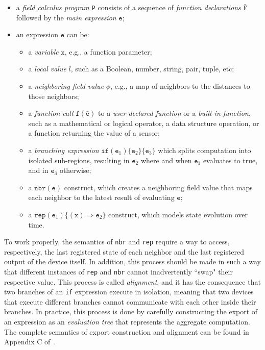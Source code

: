 \begin{itemize}
    \item a \textit{field calculus program} $\texttt{P}$ consists of a sequence of \textit{function declarations} $\bar{\texttt{F}}$ followed by the \textit{main expression} $\texttt{e}$;
    \item an expression $\texttt{e}$ can be:
    \begin{itemize}
        \item a \textit{variable} $\texttt{x}$, e.g., a function parameter;
        \item a \textit{local value} $l$, such as a Boolean, number, string, pair, tuple, etc;
        \item a \textit{neighboring field value} $\phi$, e.g., a map of
        neighbors to the distances to those neighbors;
        \item a \textit{function call} $\texttt{f}(\bar{\texttt{e}})$ to a \textit{user-declared function} or a \textit{built-in function}, such
        as a mathematical or logical operator, a data structure operation, or a function returning the value of a sensor;
        \item a \textit{branching expression} $\texttt{if} (\texttt{e}_1)\{\texttt{e}_2\}\{\texttt{e}_3\}$ which splits computation into isolated sub-regions, resulting in $\texttt{e}_2$ where and when $\texttt{e}_1$ evaluates to true, and in $\texttt{e}_3$ otherwise;
        \item a $\texttt{nbr}(\texttt{e})$ construct, which creates a neighboring field value that maps each neighbor to the latest result of evaluating $\texttt{e}$;
        \item a $\texttt{rep}(\texttt{e}_1)\{(\texttt{x})\Rightarrow \texttt{e}_2\}$ construct, which models state evolution over time.
    \end{itemize}
\end{itemize}

To work properly, the semantics of \texttt{nbr} and \texttt{rep} require a way to access, respectively, the last registered state of each neighbor and the last registered output of the device itself. In addition, this process should be made in such a way that different instances of \texttt{rep} and \texttt{nbr} cannot inadvertently ``swap" their respective value. This process is called \textit{alignment}, and it has the consequence that two branches of an \texttt{if} expression execute in isolation, meaning that two devices that execute different branches cannot communicate with each other inside their branches. In practice, this process is done by carefully constructing the export of an expression as an \textit{evaluation tree} that represents the aggregate computation. The complete semantics of export construction and alignment can be found in Appendix C of~\cite{Viroli2018}.

